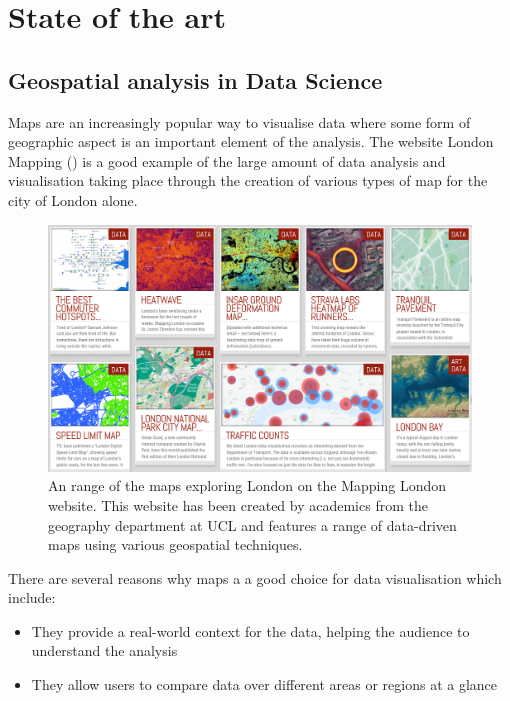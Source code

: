
\chapter{State of the art} %

\label{ChapterX} %


\section{Geospatial analysis in Data Science}

Maps are an increasingly popular way to visualise data where some form of geographic aspect is an important element of the analysis. The website London Mapping (\cite{LMap}) is a good example of the large amount of data analysis and visualisation taking place through the creation of various types of map for the city of London alone.

\begin{figure}[H]
\centering
\includegraphics[scale=0.5]{figures/london_mapping}
\decoRule
\caption{An range of the maps exploring London on the Mapping London website. This website has been created by academics from the geography department at UCL and features a range of data-driven maps using various geospatial techniques.}
\end{figure}

There are several reasons why maps a a good choice for data visualisation which include:
\begin{itemize}
\item
They provide a real-world context for the data, helping the audience to understand the analysis
\item
They allow users to compare data over different areas or regions at a glance
\end{itemize}

